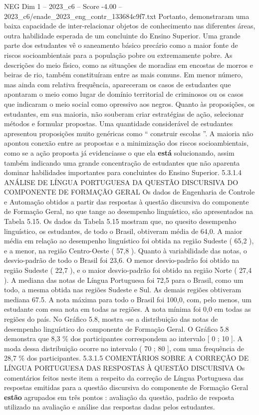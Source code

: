 \begin{textsample}{NEG Dim 1 – 2023\_c6 – Score -4.00 – 2023\_c6/enade\_2023\_eng\_contr\_133684c9f7.txt}
Portanto, demonstraram uma baixa capacidade de inter-relacionar objetos de conhecimento nas diferentes áreas, outra habilidade esperada de um concluinte do Ensino Superior.
Uma grande parte dos estudantes vê o saneamento básico precário como a maior fonte de riscos socioambientais para a população pobre ou extremamente pobre.
As descrições do meio físico, como as situações de moradias em encostas de morros e beiras de rio, também constituíram entre as mais comuns.
Em menor número, mas ainda com relativa frequência, apareceram os casos de estudantes que apontaram o meio como lugar de domínio territorial de criminosos ou os casos que indicaram o meio social como opressivo aos negros.
Quanto às proposições, os estudantes, em sua maioria, não souberam criar estratégias de ação, selecionar métodos e formular propostas.
Uma quantidade considerável de estudantes apresentou proposições muito genéricas como “ construir escolas ”.
A maioria não apontou conexão entre as propostas e a minimização dos riscos socioambientais, como se a ação proposta já evidenciasse o que ela \textbf{está} solucionando, assim também indicando uma grande concentração de estudantes que não aparenta dominar habilidades importantes para concluintes do Ensino Superior. 5.3.1.4 ANÁLISE DE LÍNGUA PORTUGUESA DA QUESTÃO DISCURSIVA DO COMPONENTE DE FORMAÇÃO GERAL Os dados de Engenharia de Controle e Automação obtidos a partir das respostas à questão discursiva do componente de Formação Geral, no que tange ao desempenho linguístico, são apresentados na Tabela 5.15.
Os dados da Tabela 5.15 mostram que, no quesito desempenho linguístico, os estudantes, de todo o Brasil, obtiveram média de 64,0.
A maior média em relação ao desempenho linguístico foi obtida na região Sudeste ( 65,2 ), e a menor, na região Centro-Oeste ( 57,8 ).
Quanto à variabilidade das notas, o desvio-padrão de todo o Brasil foi 23,6.
O menor desvio-padrão foi obtido na região Sudeste ( 22,7 ), e o maior desvio-padrão foi obtido na região Norte ( 27,4 ).
A mediana das notas de Língua Portuguesa foi 72,5 para o Brasil, como um todo, a mesma obtida nas regiões Sudeste e Sul.
As demais regiões obtiveram mediana 67.5.
A nota máxima para todo o Brasil foi 100,0, com, pelo menos, um estudante com essa nota em todas as regiões.
A nota mínima foi 0,0 em todas as regiões do país.
No Gráfico 5.8, mostra -se a distribuição das notas de desempenho linguístico do componente de Formação Geral.
O Gráfico 5.8 demonstra que 8,3 \% dos participantes correspondem ao intervalo [ 0 ; 10 ].
A moda dessa distribuição ocorre no intervalo ( 70 ; 80 ], com uma frequência de 28,7 \% dos participantes. 5.3.1.5 COMENTÁRIOS SOBRE A CORREÇÃO DE LÍNGUA PORTUGUESA DAS RESPOSTAS À QUESTÃO DISCURSIVA Os comentários feitos neste item a respeito da correção de Língua Portuguesa das respostas emitidas para a questão discursiva do componente de Formação Geral \textbf{estão} agrupados em três pontos : avaliação da questão, padrão de resposta utilizado na avaliação e análise das respostas dadas pelos estudantes.

\end{textsample}
